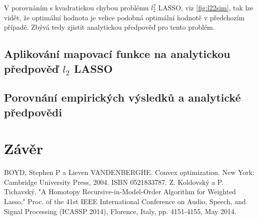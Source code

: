 \documentclass[FM,BP]{tulthesis}
\begin{document}
V porovnáním s kvadratickou chybou problému $l_{2}^{2}$ LASSO, viz \ref{fig:l22sim}, tak lze vidět, že optimální hodnota je velice podobná optimální hodnotě v předchozím případě. Zbývá tedy zjistit analytickou předpověď pro tento problém.

\section{Aplikování mapovací funkce na analytickou předpověď  $l_{2}$ LASSO}

\section{Porovnání empirických výsledků a analytické předpovědi}
\chapter{Závěr}
\label{ch:end}

\renewcommand{\bibname}{Seznam použité literatury}
\begin{thebibliography}{99}
 BOYD, Stephen P a Lieven VANDENBERGHE. Convex optimization. New York: Cambridge University Press, 2004. ISBN 0521833787.
Z. Koldovský a P. Tichavský, "A Homotopy Recursive-in-Model-Order Algorithm for Weighted Lasso," Proc. of the 41st IEEE International Conference on Audio, Speech, and Signal Processing (ICASSP 2014), Florence, Italy, pp. 4151-4155, May 2014.
\end{thebibliography}
\clearpage
\appendix
\end{document}
